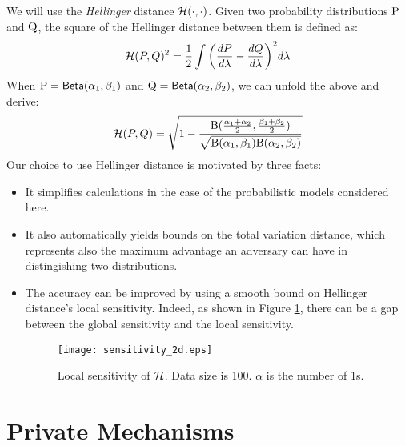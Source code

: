 \documentclass{article}
\begin{document}
We will use the \emph{Hellinger} distance $\mathcal{H}(\cdot,\cdot)$.
Given two probability distributions $\textup{P}$ and $\textup{Q}$,
the square of the Hellinger distance between them is defined as:
\[
\mathcal{H}(P,Q)^2 =\frac{1}{2} \int \bigg(\frac{dP}{d \lambda} - \frac{dQ}{d \lambda}\bigg)^2 d \lambda
\]
When $\textup{P}=\mathsf{Beta}(\alpha_1, \beta_1)$ and $\textup{Q}=\mathsf{Beta}(\alpha_2, \beta_2)$, we can unfold the above and derive: 
\[
 \mathcal{H}(P,Q) =  \sqrt{1 - \frac{\textup{B}(\frac{\alpha_1 + \alpha_2}{2}, \frac{\beta_1 + \beta_2}{2})}{\sqrt{\textup{B}(\alpha_1,\beta_1)\textup{B}(\alpha_2,\beta_2)}}}
\]
Our choice to use Hellinger distance is motivated by three facts:
\begin{itemize}
  \item It simplifies calculations in the case of the probabilistic models considered here.
  
  \item It also automatically yields bounds on the total variation distance, which represents also the maximum advantage an adversary can have in distingishing two distributions. 

  \item The accuracy can be improved by using a smooth bound on Hellinger distance's local sensitivity. Indeed, as shown in Figure \ref{fig_sensitivity}, there can be a gap
    between the global sensitivity and the local sensitivity.
\begin{figure}[ht]
\centering
\texttt{[image: sensitivity\_2d.eps]}
\caption{Local sensitivity of $\mathcal{H}$. Data size is 100. $\alpha$ is the number of 1s.}
\label{fig_sensitivity}
\end{figure}
\end{itemize}



\section{Private Mechanisms}
\label{sec_mechs}
\end{document}
